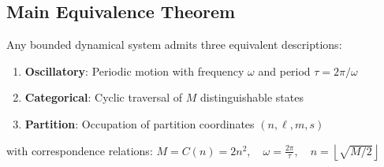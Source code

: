 \subsection{Main Equivalence Theorem}

\begin{theorem}
\label{thm:triple}
Any bounded dynamical system admits three equivalent descriptions:
\begin{enumerate}
    \item \textbf{Oscillatory}: Periodic motion with frequency $\omega$ and period $\tau = 2\pi/\omega$
    \item \textbf{Categorical}: Cyclic traversal of $M$ distinguishable states
    \item \textbf{Partition}: Occupation of partition coordinates $(n, \ell, m, s)$
\end{enumerate}
with correspondence relations:
$
M = C(n) = 2n^2, \quad \omega = \frac{2\pi}{\tau}, \quad n = \left\lfloor \sqrt{M/2} \right\rfloor
$
\end{theorem}


